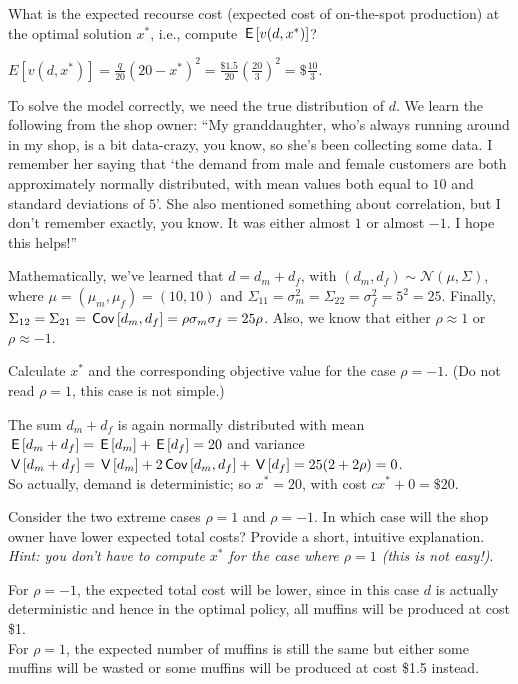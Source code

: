 \documentclass[assignments]{subfiles}
\begin{document}
\begin{exercise}
 What is the expected recourse cost (expected cost of on-the-spot production) at the optimal solution $x^*$, i.e., compute $\,\mathsf{E}\left[v(d,x^*)\right]$?
 \begin{solution}
 $E\left[v(d,x^*)\right] = \tfrac{q}{20}(20-x^*)^2 = \frac{\$1.5}{20}\left(\frac{20}{3}\right)^2 = \$\frac{10}3$.
 \end{solution}
\end{exercise}

To solve the model correctly, we need the true distribution of $d$. We learn the following from the shop owner: ``My granddaughter, who's always running around in my shop, is a bit data-crazy, you know, so she's been collecting some data. I remember her saying that `the demand from male and female customers are both approximately normally distributed, with mean values both equal to $10$ and standard deviations of $5$'. She also mentioned something about correlation, but I don't remember exactly, you know. It was either almost $1$ or almost $-1$. I hope this helps!''

Mathematically, we've learned that $d = d_m + d_f$, with $(d_m, d_f) \sim \mathcal{N}(\mu, \Sigma)$, where $\mu = (\mu_m, \mu_f) = (10,10)$ and $\Sigma_{11} = \sigma_m^2 = \Sigma_{22}  = \sigma_f^2 = 5^2 = 25$. Finally, $\Sigma_{12} = \Sigma_{21} = \,\mathsf{Cov}\left[d_m, d_f\right] = \rho \sigma_m \sigma_f = 25 \rho$. Also, we know that either $\rho \approx 1$ or $\rho \approx -1$.

\begin{exercise}
 Calculate $x^*$ and the corresponding objective value for the case $\rho = -1$. (Do not read  $\rho=1$, this case is not simple.)
 \begin{solution}
The sum  $d_m+d_f$ is again normally distributed with mean $\,\mathsf{E}\left[d_m + d_f\right] = \,\mathsf{E}\left[d_m\right] + \,\mathsf{E}\left[d_f\right] = 20$ and variance $\,\mathsf{V}\left[d_m + d_f\right] = \,\mathsf{V}\left[d_m\right] + 2\,\mathsf{Cov}\left[d_m, d_f\right] + \,\mathsf{V}\left[d_f\right] = 25(2+2\rho) = 0$.  \\ \medskip
So actually, demand is deterministic; so $x^* = 20$, with cost $cx^*+0 = \$20$.
\end{solution}
\end{exercise}

\begin{exercise}
Consider the two extreme cases $\rho = 1$ and $\rho = -1$.
In which case will the shop owner have lower expected total costs?
Provide a short, intuitive explanation.
\textit{Hint: you don't have to compute $x^*$ for the case where $\rho = 1$ (this is not easy!)}.
\begin{solution}
For $\rho = -1$, the expected total cost will be lower, since in this case $d$ is actually deterministic and hence in the optimal policy, all muffins will be produced at cost \$1. \\ For $\rho = 1$, the expected number of muffins is still the same but either some muffins will be wasted or some muffins will be produced at cost \$1.5 instead.
\end{solution}
\end{exercise}
\end{document}

